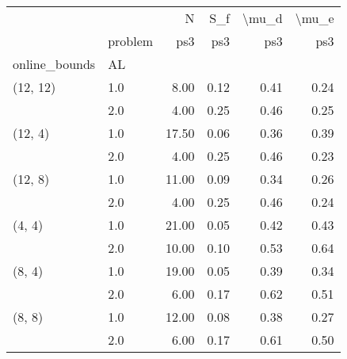 \begin{tabular}{llrrrr}
\toprule
       & {} &     N &  S\_f & \textbackslash mu\_d & \textbackslash mu\_e \\
       & problem &   ps3 &  ps3 &   ps3 &   ps3 \\
online\_bounds & AL &       &      &       &       \\
\midrule
(12, 12) & 1.0 &  8.00 & 0.12 &  0.41 &  0.24 \\
       & 2.0 &  4.00 & 0.25 &  0.46 &  0.25 \\
(12, 4) & 1.0 & 17.50 & 0.06 &  0.36 &  0.39 \\
       & 2.0 &  4.00 & 0.25 &  0.46 &  0.23 \\
(12, 8) & 1.0 & 11.00 & 0.09 &  0.34 &  0.26 \\
       & 2.0 &  4.00 & 0.25 &  0.46 &  0.24 \\
(4, 4) & 1.0 & 21.00 & 0.05 &  0.42 &  0.43 \\
       & 2.0 & 10.00 & 0.10 &  0.53 &  0.64 \\
(8, 4) & 1.0 & 19.00 & 0.05 &  0.39 &  0.34 \\
       & 2.0 &  6.00 & 0.17 &  0.62 &  0.51 \\
(8, 8) & 1.0 & 12.00 & 0.08 &  0.38 &  0.27 \\
       & 2.0 &  6.00 & 0.17 &  0.61 &  0.50 \\
\bottomrule
\end{tabular}
